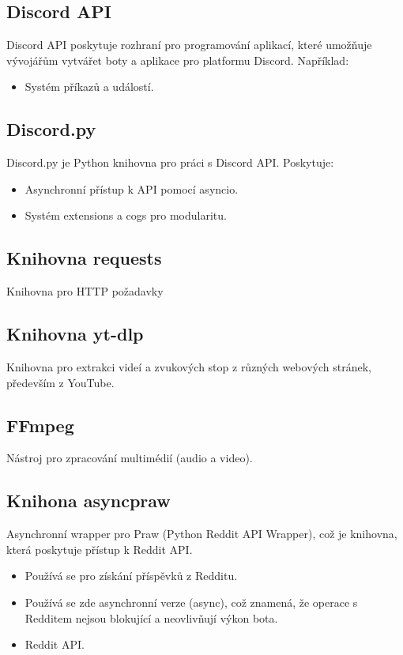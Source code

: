 \documentclass[12pt, a4paper]{report}
\begin{document}
\subsection{Discord API}
Discord API poskytuje rozhraní pro programování aplikací, které umožňuje vývojářům vytvářet boty a aplikace pro platformu Discord. Například:
\begin{itemize}
    \item Systém příkazů a událostí.
\end{itemize}

\subsection{Discord.py}
Discord.py je Python knihovna pro práci s Discord API. Poskytuje:
\begin{itemize}
    \item Asynchronní přístup k API pomocí asyncio.
    \item Systém extensions a cogs pro modularitu.
\end{itemize}

\subsection{Knihovna requests}
Knihovna pro HTTP požadavky
\subsection{Knihovna yt-dlp}
Knihovna pro extrakci videí a zvukových stop z různých webových stránek, především z YouTube.
\subsection{FFmpeg}
Nástroj pro zpracování multimédií (audio a video).
\subsection{Knihona asyncpraw}
Asynchronní wrapper pro Praw (Python Reddit API Wrapper), což je knihovna, která poskytuje přístup k Reddit API.
\begin{itemize}
    \item Používá se pro získání příspěvků z Redditu.
    \item Používá se zde asynchronní verze (async), což znamená, že operace s Redditem nejsou blokující a neovlivňují výkon bota.
    \item Reddit API.
\end{itemize}
\end{document}
